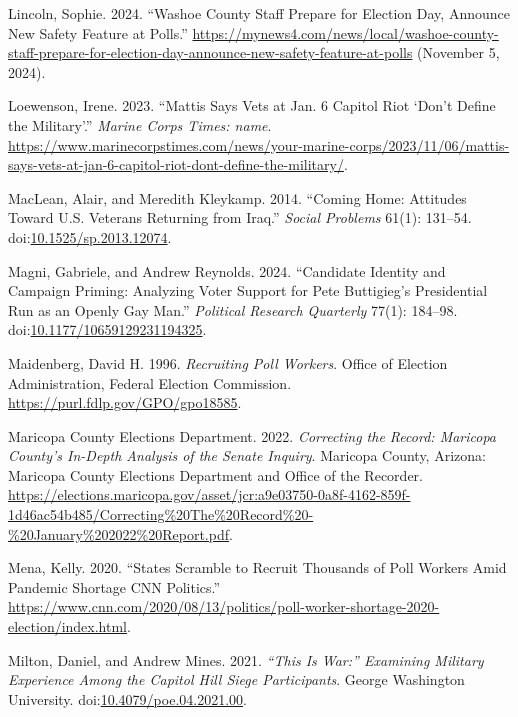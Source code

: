 \documentclass[
  11pt,
  a4paper,
]{scrartcl}
\newlength{\cslhangindent}
\newenvironment{CSLReferences}[2] %
 {\begin{list}{}{%
  \setlength{\itemindent}{0pt}
  \setlength{\leftmargin}{0pt}
  \setlength{\parsep}{0pt}
  \ifodd #1
   \setlength{\leftmargin}{\cslhangindent}
   \setlength{\itemindent}{-1\cslhangindent}
  \fi
  \setlength{\itemsep}{#2\baselineskip}}}
 {\end{list}}
\begin{document}
\begin{CSLReferences}{1}{1}
Lincoln, Sophie. 2024. {``Washoe {County} Staff Prepare for {Election
Day}, Announce New Safety Feature at Polls.''}
\url{https://mynews4.com/news/local/washoe-county-staff-prepare-for-election-day-announce-new-safety-feature-at-polls}
(November 5, 2024).

Loewenson, Irene. 2023. {``Mattis Says Vets at {Jan}. 6 {Capitol} Riot
{`Don't Define the Military'}.''} \emph{Marine Corps Times: name}.
\url{https://www.marinecorpstimes.com/news/your-marine-corps/2023/11/06/mattis-says-vets-at-jan-6-capitol-riot-dont-define-the-military/}.

MacLean, Alair, and Meredith Kleykamp. 2014. {``Coming {Home}:
{Attitudes} Toward {U}.{S}. {Veterans Returning} from {Iraq}.''}
\emph{Social Problems} 61(1): 131--54.
doi:\href{https://doi.org/10.1525/sp.2013.12074}{10.1525/sp.2013.12074}.

Magni, Gabriele, and Andrew Reynolds. 2024. {``Candidate {Identity} and
{Campaign Priming}: {Analyzing Voter Support} for {Pete Buttigieg}'s
{Presidential Run} as an {Openly Gay Man}.''} \emph{Political Research
Quarterly} 77(1): 184--98.
doi:\href{https://doi.org/10.1177/10659129231194325}{10.1177/10659129231194325}.

Maidenberg, David H. 1996. \emph{Recruiting {Poll Workers}}. Office of
Election Administration, Federal Election Commission.
\url{https://purl.fdlp.gov/GPO/gpo18585}.

Maricopa County Elections Department. 2022. \emph{Correcting the
{Record}: {Maricopa County}'s {In-Depth Analysis} of the {Senate
Inquiry}}. Maricopa County, Arizona: {Maricopa County Elections
Department and Office of the Recorder}.
\url{https://elections.maricopa.gov/asset/jcr:a9e03750-0a8f-4162-859f-1d46ac54b485/Correcting\%20The\%20Record\%20-\%20January\%202022\%20Report.pdf}.

Mena, Kelly. 2020. {``States Scramble to Recruit Thousands of Poll
Workers Amid Pandemic Shortage \textbar{} {CNN Politics}.''}
\url{https://www.cnn.com/2020/08/13/politics/poll-worker-shortage-2020-election/index.html}.

Milton, Daniel, and Andrew Mines. 2021. \emph{{``{This} Is {War}:''}
{Examining Military Experience Among} the {Capitol Hill Siege
Participants}}. George Washington University.
doi:\href{https://doi.org/10.4079/poe.04.2021.00}{10.4079/poe.04.2021.00}.


\end{CSLReferences}
\end{document}
